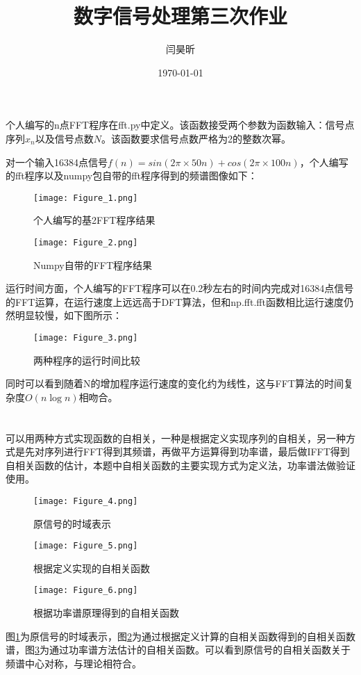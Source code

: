 \documentclass[12pt]{ctexart}
\title{数字信号处理第三次作业}
\author{闫昊昕}
\date{\today}
\affil{2019210361}
\begin{document}
    \maketitle

    \pagestyle{empty}
    \section{}
    个人编写的n点FFT程序在fft.py中定义。该函数接受两个参数为函数输入：信号点序列$x_n$以及信号点数$N$。该函数要求信号点数严格为2的整数次幂。\par
    对一个输入16384点信号$f(n)=sin(2\pi\times 50n) + cos(2\pi\times 100n)$，个人编写的fft程序以及numpy包自带的fft程序得到的频谱图像如下：
    \begin{figure}[H]
        \centering
        \texttt{[image: Figure\_1.png]}
        \caption{个人编写的基2FFT程序结果}
    \end{figure}
    \begin{figure}[H]
        \centering
        \texttt{[image: Figure\_2.png]}
        \caption{Numpy自带的FFT程序结果}
    \end{figure} \par
    运行时间方面，个人编写的FFT程序可以在0.2秒左右的时间内完成对16384点信号的FFT运算，在运行速度上远远高于DFT算法，但和np.fft.fft函数相比运行速度仍然明显较慢，如下图所示：
    \begin{figure}[H]
        \centering
        \texttt{[image: Figure\_3.png]}
        \caption{两种程序的运行时间比较}
    \end{figure}
    同时可以看到随着N的增加程序运行速度的变化约为线性，这与FFT算法的时间复杂度$O(n\log n)$相吻合。

    \section{}
    可以用两种方式实现函数的自相关，一种是根据定义实现序列的自相关，另一种方式是先对序列进行FFT得到其频谱，再做平方运算得到功率谱，最后做IFFT得到自相关函数的估计，本题中自相关函数的主要实现方式为定义法，功率谱法做验证使用。
    \begin{figure}[H]
        \centering
        \texttt{[image: Figure\_4.png]}
        \caption{原信号的时域表示}\label{fig:original}
    \end{figure}
    \begin{figure}[H]
        \centering
        \texttt{[image: Figure\_5.png]}
        \caption{根据定义实现的自相关函数}\label{fig:self}
    \end{figure}
    \begin{figure}[H]
        \centering
        \texttt{[image: Figure\_6.png]}
        \caption{根据功率谱原理得到的自相关函数}\label{fig:val}
    \end{figure} \par
    图\ref{fig:original}为原信号的时域表示，图\ref{fig:self}为通过根据定义计算的自相关函数得到的自相关函数谱，图\ref{fig:val}为通过功率谱方法估计的自相关函数。可以看到原信号的自相关函数关于频谱中心对称，与理论相符合。
\end{document}

